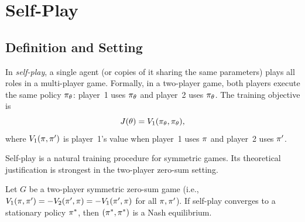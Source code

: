 \documentclass[11pt,a4paper]{article}
\begin{document}
\section{Self-Play}
\label{sec:selfplay}

\subsection{Definition and Setting}

\begin{definition}
\label{def:selfplay}
In \emph{self-play}, a single agent (or copies of it sharing the same
parameters) plays all roles in a multi-player game.  Formally, in a
two-player game, both players execute the same policy
$\pi_\theta$: player~1 uses $\pi_\theta$ and player~2 uses
$\pi_\theta$.  The training objective is
\begin{equation}
\label{eq:selfplay-objective}
  J(\theta) = V_1(\pi_\theta, \pi_\theta),
\end{equation}
where $V_1(\pi, \pi')$ is player~1's value when player~1 uses
$\pi$ and player~2 uses $\pi'$.
\end{definition}

Self-play is a natural training procedure for symmetric games.  Its
theoretical justification is strongest in the two-player zero-sum
setting.

\begin{theorem}
\label{thm:selfplay-ne}
Let $G$ be a two-player symmetric zero-sum game (i.e.,
$V_1(\pi, \pi') = -V_2(\pi', \pi) = -V_1(\pi', \pi)$
for all $\pi, \pi'$).  If self-play converges to a stationary
policy $\pi^*$, then $(\pi^*, \pi^*)$ is a Nash equilibrium.
\end{theorem}
\end{document}

